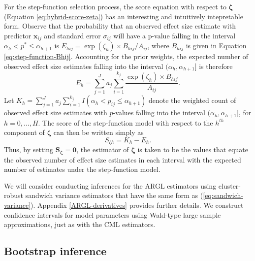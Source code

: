 \documentclass[
  man, donotrepeattitle,floatsintext]{apa7}
\begin{document}
For the step-function selection process, the score equation with respect to \(\boldsymbol\zeta\) (Equation \eqref{eq:hybrid-score-zeta}) has an interesting and intuitively intepretable form.
Observe that the probability that an observed effect size estimate with predictor \(\mathbf{x}_{ij}\) and standard error \(\sigma_{ij}\) will have a p-value falling in the interval \(\alpha_h < p^* \leq \alpha_{h+1}\) is \(E_{hij} = \exp(\zeta_h) \times B_{hij} / A_{ij}\), where \(B_{hij}\) is given in Equation \eqref{eq:step-function-Bhij}.
Accounting for the prior weights, the expected number of observed effect size estimates falling into the interval \((\alpha_h, \alpha_{h+1}]\) is therefore
\begin{equation}
\label{eq:expected-h}
E_h = \sum_{j=1}^J  a_j \sum_{i=1}^{k_j} \frac{\exp(\zeta_h) \times B_{hij}}{A_{ij}}.
\end{equation}
Let \(K_h = \sum_{j=1}^J a_j \sum_{i=1}^{k_j} I\left(\alpha_h < p_{ij} \leq \alpha_{h+1}\right)\) denote the weighted count of observed effect size estimates with \(p\)-values falling into the interval \((\alpha_h, \alpha_{h+1}]\), for \(h = 0,...,H\).
The score of the step-function model with respect to the \(h^{th}\) component of \(\boldsymbol\zeta\) can then be written simply as
\begin{equation}
S_{\zeta h} = K_h - E_h.
\end{equation}
Thus, by setting \(\mathbf{S}_{\boldsymbol\zeta} = \mathbf{0}\), the estimator of \(\boldsymbol\zeta\) is taken to be the values that equate the observed number of effect size estimates in each interval with the expected number of estimates under the step-function model.

We will consider conducting inferences for the ARGL estimators using cluster-robust sandwich variance estimators that have the same form as (\ref{eq:sandwich-variance}).
Appendix \ref{ARGL-derivatives} provides further details.
We construct confidence intervals for model parameters using Wald-type large sample approximations, just as with the CML estimators.

\subsection{Bootstrap inference}\label{bootstrap-inference}
\end{document}
